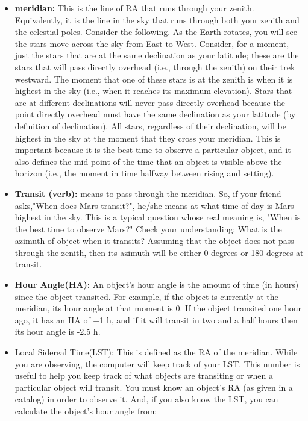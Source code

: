 \documentclass[10pt]{report}
\begin{document}
\begin{itemize}
\item \textbf{meridian:}  This is the line of RA that runs through your zenith.  Equivalently, it is the line in the sky that runs through both your zenith and the celestial poles.  Consider the following.  As the Earth rotates, you will see the stars move across the sky from East to West.  Consider, for a moment, just the stars that are at the same declination as your latitude; these are the stars that will pass directly overhead (i.e., through the zenith) on their trek westward.  The moment that one of these stars is at the zenith is when it is highest in the sky (i.e., when it reaches its maximum elevation).  Stars that are at different declinations will never pass directly overhead because the point directly overhead must have the same declination as your latitude (by definition of declination).  All stars, regardless of their declination, will be highest in the sky at the moment that they cross your meridian.  This is important because it is the best time to observe a particular object, and it also defines the mid-point of the time that an object is visible above the horizon (i.e., the moment in time halfway between rising and setting). 
\item \textbf{Transit (verb):}  means to pass through the meridian.  So, if your friend asks,"When does Mars transit?", he/she means at what time of day is Mars highest in the sky.  This is a typical question whose real meaning is, "When is the best time to observe Mars?"  Check your understanding: What is the azimuth of object when it transits?  Assuming that the object does not pass through the zenith, then its azimuth will be either 0 degrees or 180 degrees at transit. 
\item \textbf{Hour Angle(HA):}  An object's hour angle is the amount of time (in hours) since the object transited.  For example, if the object is currently at the meridian, its hour angle at that moment is 0.  If the object transited one hour ago, it has an HA of  +1 h, and if it will transit in two and a half hours then its hour angle is -2.5 h. 
\item Local Sidereal Time(LST):  This is defined as the RA of the meridian.  While you are observing, the computer will keep track of your LST.  This number is useful to help you keep track of what objects are transiting or when a particular object will transit.  You must know an object's RA (as given in a catalog) in order to observe it.  And, if you also know the LST, you can calculate the object's hour angle from: 
\begin{equation}

\end{equation}
\end{itemize}
\end{document}
